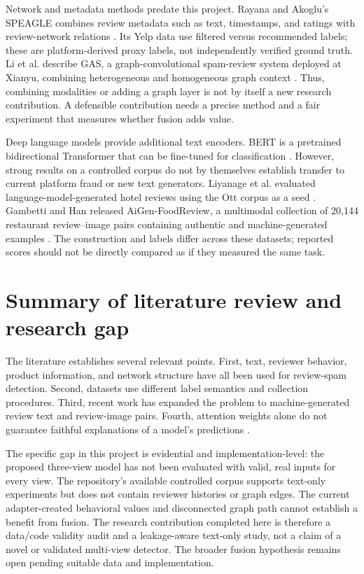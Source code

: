 \documentclass[12pt,a4paper]{report}
\begin{document}
Network and metadata methods predate this project. Rayana and Akoglu's SPEAGLE combines review metadata such as text, timestamps, and ratings with review-network relations \cite{rayana2015}. Its Yelp data use filtered versus recommended labels; these are platform-derived proxy labels, not independently verified ground truth. Li et al. describe GAS, a graph-convolutional spam-review system deployed at Xianyu, combining heterogeneous and homogeneous graph context \cite{li2019gas}. Thus, combining modalities or adding a graph layer is not by itself a new research contribution. A defensible contribution needs a precise method and a fair experiment that measures whether fusion adds value.

Deep language models provide additional text encoders. BERT is a pretrained bidirectional Transformer that can be fine-tuned for classification \cite{devlin2019}. However, strong results on a controlled corpus do not by themselves establish transfer to current platform fraud or new text generators. Liyanage et al. evaluated language-model-generated hotel reviews using the Ott corpus as a seed \cite{liyanage2024}. Gambetti and Han released AiGen-FoodReview, a multimodal collection of 20,144 restaurant review--image pairs containing authentic and machine-generated examples \cite{gambetti2024}. The construction and labels differ across these datasets; reported scores should not be directly compared as if they measured the same task.

\section{Summary of literature review and research gap}

The literature establishes several relevant points. First, text, reviewer behavior, product information, and network structure have all been used for review-spam detection. Second, datasets use different label semantics and collection procedures. Third, recent work has expanded the problem to machine-generated review text and review-image pairs. Fourth, attention weights alone do not guarantee faithful explanations of a model's predictions \cite{jain2019}.

The specific gap in this project is evidential and implementation-level: the proposed three-view model has not been evaluated with valid, real inputs for every view. The repository's available controlled corpus supports text-only experiments but does not contain reviewer histories or graph edges. The current adapter-created behavioral values and disconnected graph path cannot establish a benefit from fusion. The research contribution completed here is therefore a data/code validity audit and a leakage-aware text-only study, not a claim of a novel or validated multi-view detector. The broader fusion hypothesis remains open pending suitable data and implementation.
\end{document}
